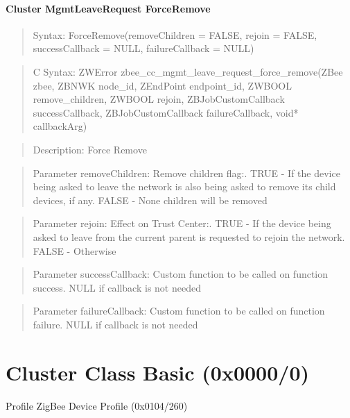 \paragraph{Cluster MgmtLeaveRequest ForceRemove}
\begin{quote}Syntax: ForceRemove(removeChildren = FALSE, rejoin = FALSE, successCallback = NULL, failureCallback = NULL)\end{quote}
\begin{quote}C Syntax: ZWError zbee\_cc\_mgmt\_leave\_request\_force\_remove(ZBee zbee, ZBNWK node\_id, ZEndPoint endpoint\_id, ZWBOOL remove\_children, ZWBOOL rejoin, ZBJobCustomCallback successCallback, ZBJobCustomCallback failureCallback, void* callbackArg)\end{quote}
\begin{quote}Description: Force Remove\end{quote}
\begin{quote}Parameter removeChildren: Remove children flag:. TRUE  - If the device being asked to leave the network is also being asked to remove its child devices, if any. FALSE - None children will be removed\end{quote}
\begin{quote}Parameter rejoin: Effect on Trust Center:. TRUE  - If the device being asked to leave from the current parent is requested to rejoin the network. FALSE - Otherwise\end{quote}
\begin{quote}Parameter successCallback: Custom function to be called on function success. NULL if callback is not needed\end{quote}
\begin{quote}Parameter failureCallback: Custom function to be called on function failure. NULL if callback is not needed\end{quote}



\section{Cluster Class Basic (0x0000/0)}

Profile ZigBee Device Profile (0x0104/260)

